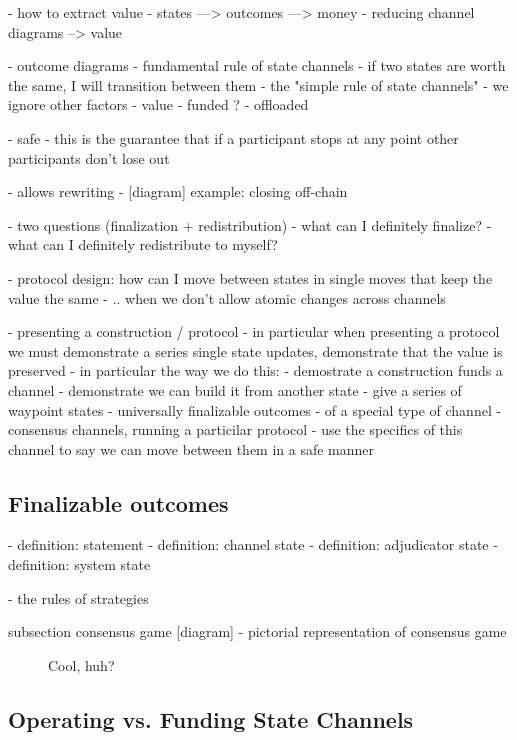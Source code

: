 \documentclass{article}
\begin{document}
- how to extract value
- states ---> outcomes ---> money
- reducing channel diagrams --> value

- outcome diagrams
- fundamental rule of state channels - if two states are worth the same, I will transition between them
- the "simple rule of state channels" - we ignore other factors
- value
- funded ?
- offloaded

- safe
- this is the guarantee that if a participant stops at any point other participants don't lose out

- allows rewriting
- [diagram] example: closing off-chain

- two questions (finalization + redistribution)
  - what can I definitely finalize?
  - what can I definitely redistribute to myself?

- protocol design: how can I move between states in single moves that keep the value the same
- .. when we don't allow atomic changes across channels

- presenting a construction / protocol
- in particular when presenting a protocol we must demonstrate a series single state updates, demonstrate that the value is preserved
- in particular the way we do this:
  - demostrate a construction funds a channel
  - demonstrate we can build it from another state
    - give a series of waypoint states - universally finalizable outcomes
    - of a special type of channel - consensus channels, running a particilar protocol
    - use the specifics of this channel to say we can move between them in a safe manner


\subsection{Finalizable outcomes}

- definition: statement
- definition: channel state
- definition: adjudicator state
- definition: system state

- the rules of strategies

subsection consensus game
[diagram] - pictorial representation of consensus game

\begin{figure}[h]\centering
  \makebox[\textwidth][c]{}
  \caption{Cool, huh?}
\end{figure}


\subsection{Operating vs. Funding State Channels}
\end{document}
